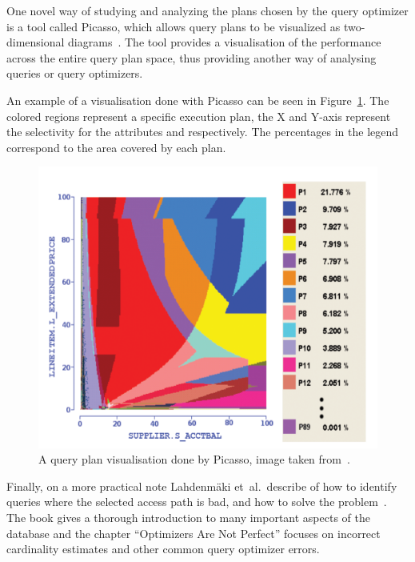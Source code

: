 One novel way of studying and analyzing the plans chosen by the query optimizer is a tool called Picasso, which allows query plans to be visualized as two-dimensional diagrams~\cite{haritsa_2010_picasso_tpdqov}. The tool provides a visualisation of the performance across the entire query plan space, thus providing another way of analysing queries or query optimizers.

An example of a visualisation done with Picasso can be seen in Figure~\ref{fig:picasso}. The colored regions represent a specific execution plan, the X and Y-axis represent the selectivity for the attributes  and  respectively. The percentages in the legend correspond to the area covered by each plan.

\begin{figure}[ht]
\includegraphics[scale=0.6]{Images/Picasso.png}
\caption[A query plan visualisation done by Picasso]{A query plan visualisation done by Picasso, image taken from~\cite{haritsa_2010_picasso_tpdqov}.}\label{fig:picasso}
\end{figure}

Finally, on a more practical note Lahdenmäki  et\ al.\ describe of how to identify queries where the selected access path is bad, and how to solve the problem~\cite{lahdenmaki_2005_relational_rdidatodossea}. The book gives a thorough introduction to many important aspects of the database and the chapter ``Optimizers Are Not Perfect'' focuses on incorrect cardinality estimates and other common query optimizer errors.

